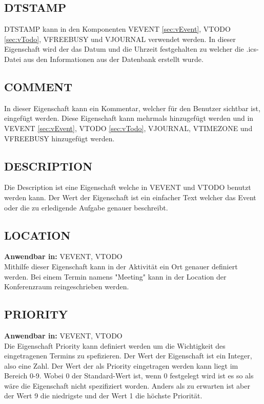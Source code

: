 \subsection{DTSTAMP}
\label{sec:dtstamp}
DTSTAMP kann in den Komponenten VEVENT \ref{sec:vEvent}, VTODO \ref{sec:vTodo}, VFREEBUSY und VJOURNAL verwendet werden. In dieser Eigenschaft wird der das Datum und die Uhrzeit festgehalten zu welcher die .ics-Datei aus den Informationen aus der Datenbank erstellt wurde.
\subsection{COMMENT}
\label{sec:comment}
In dieser Eigenschaft kann ein Kommentar, welcher für den Benutzer sichtbar ist, eingefügt werden. Diese Eigenschaft kann mehrmals hinzugefügt werden und in VEVENT \ref{sec:vEvent}, VTODO \ref{sec:vTodo}, VJOURNAL, VTIMEZONE und VFREEBUSY hinzugefügt werden.
\subsection{DESCRIPTION}
\label{sec:description}
Die Description ist eine Eigenschaft welche in VEVENT und VTODO benutzt werden kann. Der Wert der Eigenschaft ist ein einfacher Text welcher das Event oder die zu erledigende Aufgabe genauer beschreibt. 
\subsection{LOCATION}
\label{sec:location}
\textbf{Anwendbar in:} VEVENT, VTODO \\ %
Mithilfe dieser Eigenschaft kann in der Aktivität ein Ort genauer definiert werden. Bei einem Termin namens "Meeting" kann in der Location der Konferenzraum reingeschrieben werden. 
\subsection{PRIORITY}
\label{sec:priority}
\textbf{Anwendbar in:} VEVENT, VTODO \\
Die Eigenschaft Priority kann definiert werden um die Wichtigkeit des eingetragenen Termins zu spefizieren. Der Wert der Eigenschaft ist ein Integer, also eine Zahl. Der Wert der als Priority eingetragen werden kann liegt im Bereich 0-9. Wobei 0 der Standard-Wert ist, wenn 0 festgelegt wird ist es so als wäre die Eigenschaft nicht spezifiziert worden. Anders als zu erwarten ist aber der Wert 9 die niedrigste und der Wert 1 die höchste Priorität. 
